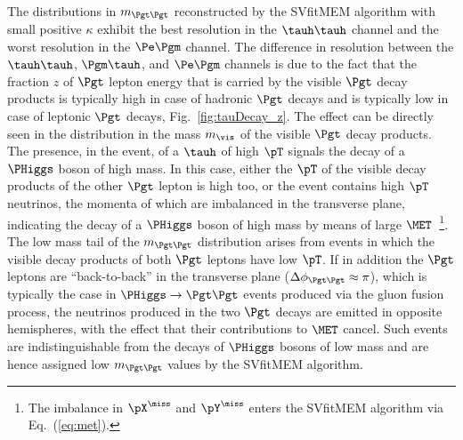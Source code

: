 The distributions in $m_{\Pgt\Pgt}$ reconstructed by the
SVfitMEM algorithm with small positive $\kappa$ exhibit the best
resolution in the $\tauh\tauh$ channel and the worst resolution in the $\Pe\Pgm$ channel.
The difference in resolution between the $\tauh\tauh$, $\Pgm\tauh$,
and $\Pe\Pgm$ channels
is due to the fact that the fraction $z$ of
$\Pgt$ lepton energy that is carried by the visible $\Pgt$ decay
products is typically high in case of hadronic $\Pgt$ decays
and is typically low in case of leptonic $\Pgt$ decays, \cf
Fig.~\ref{fig:tauDecay_z}.
The effect can be directly seen in the distribution in the mass $m_{\vis}$ of
the visible $\Pgt$ decay products.
The presence, in the event, of a $\tauh$ of high $\pT$ signals the decay of a
$\PHiggs$ boson of high mass.
In this case, either the $\pT$ of the visible decay products of the
other $\Pgt$ lepton is high too,
or the event contains high $\pT$ neutrinos, the momenta of which are imbalanced in the transverse plane,
indicating the decay of a $\PHiggs$ boson of high mass  by means of large $\MET$~\footnote{
  The imbalance in $\pX^{\miss}$ and $\pY^{\miss}$ enters the SVfitMEM algorithm via Eq.~(\ref{eq:met}).}.
The low mass tail of the $m_{\Pgt\Pgt}$ distribution arises from
events in which the visible decay products of
both $\Pgt$ leptons have low $\pT$.
If in addition the $\Pgt$ leptons are ``back-to-back'' in the transverse plane ($\Delta\phi_{\Pgt\Pgt} \approx \pi$),
which is typically the case in $\PHiggs \to \Pgt\Pgt$ events produced via the gluon fusion process,
the neutrinos produced in the two $\Pgt$ decays are emitted in opposite hemispheres, 
with the effect that their contributions to $\MET$ cancel.
Such events are indistinguishable from the decays of $\PHiggs$ bosons of low mass
and are hence assigned low $m_{\Pgt\Pgt}$ values by the SVfitMEM algorithm.

